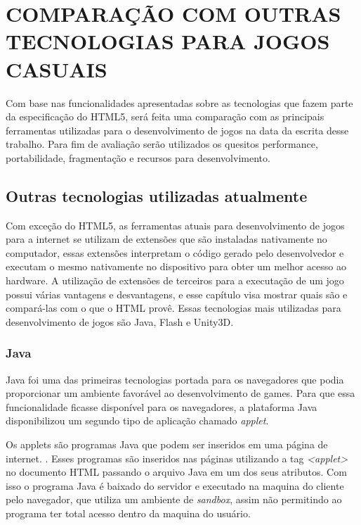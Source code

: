 \section[Comparação com outras tecnologias para jogos
casuais]{COMPARAÇÃO COM OUTRAS TECNOLOGIAS PARA JOGOS CASUAIS}

Com base nas funcionalidades apresentadas sobre as tecnologias que
fazem parte da especificação do HTML5, será feita uma comparação com
as principais ferramentas utilizadas para o desenvolvimento de jogos
na data da escrita desse trabalho. Para fim de avaliação serão
utilizados os quesitos performance, portabilidade, fragmentação e recursos para
desenvolvimento.

\subsection{Outras tecnologias utilizadas atualmente}

Com exceção do HTML5, as ferramentas atuais para desenvolvimento de jogos para a internet se
utilizam de extensões que são instaladas nativamente no computador,
essas extensões interpretam o código gerado pelo desenvolvedor e
executam o mesmo nativamente no dispositivo para obter um melhor
acesso ao hardware. A utilização de extensões de terceiros para a
executação de um jogo possui várias vantagens e desvantagens, e esse
capítulo visa mostrar quais são e compará-las com o que o HTML provê.
Essas tecnologias mais utilizadas para desenvolvimento de jogos são
Java, Flash e Unity3D.

\subsubsection{Java}

Java foi uma das primeiras tecnologias portada para os navegadores que podia proporcionar um
ambiente favorável ao desenvolvimento de games. Para que essa funcionalidade ficasse disponível para os
navegadores, a plataforma Java disponibilizou um segundo tipo de
aplicação chamado \textit{applet}.

Os applets são programas Java que podem ser inseridos em uma página de
internet. \cite{boese2009introduction}. Esses programas são inseridos nas
páginas utilizando a tag \textit{<applet>} no documento HTML passando
o arquivo Java em um dos seus atributos. Com isso o programa Java é
baixado do servidor e executado na maquina do cliente pelo navegador,
que utiliza um ambiente de \textit{sandbox}, assim não permitindo
ao programa ter total acesso dentro da maquina do usuário.

